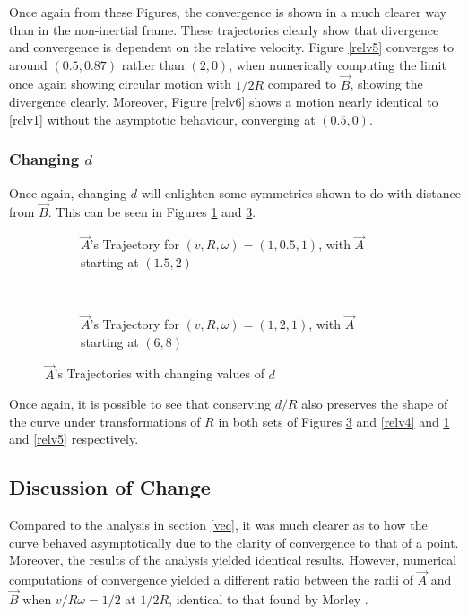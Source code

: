 \documentclass[pstricks, border=12pt]{article}
\begin{document}
Once again from these Figures, the convergence is shown in a much clearer way than in the non-inertial frame. These trajectories clearly show that divergence and convergence is dependent on the relative velocity. Figure \ref{relv5} converges to  around $(0.5, 0.87)$ rather than $(2, 0)$, when numerically computing the limit once again showing circular motion with $1/2R$ compared to $\vec B$, showing the divergence clearly. Moreover, Figure \ref{relv6} shows a motion nearly identical to \ref{relv1} without the asymptotic behaviour, converging at $(0.5, 0)$.

\subsubsection{Changing $d$}

Once again, changing $d$ will enlighten some symmetries shown to do with distance from $\vec B$. This can be seen in Figures \ref{relv8} and \ref{relv7}.
\begin{figure}[tbh]
    \centering
    \begin{subfigure}[t]{0.5\linewidth}
             \centering
             
             \caption{$\vec A$'s Trajectory for $(v, R, \omega) = (1, 0.5, 1)$, with $\vec A$ starting at $(1.5, 2)$}
             \label{relv8}
    \end{subfigure}%
    ~
    \begin{subfigure}[t]{0.5\linewidth}
         \centering
         
         \caption{$\vec A$'s Trajectory for $(v, R, \omega) = (1, 2, 1)$, with $\vec A$ starting at $(6, 8)$}
         \label{relv7}
    \end{subfigure}
    \caption{$\vec A$'s Trajectories with changing values of $d$}
\end{figure}



Once again, it is possible to see that conserving $d/R$ also preserves the shape of the curve under transformations of $R$ in both sets of Figures \ref{relv7} and \ref{relv4} and \ref{relv8} and \ref{relv5} respectively.

\subsection{Discussion of Change}
Compared to the analysis in section \ref{vec}, it was much clearer as to how the curve behaved asymptotically due to the clarity of convergence to that of a point. Moreover, the results of the analysis yielded identical results. However, numerical computations of convergence yielded a different ratio between the radii of $\vec A$ and $\vec B$ when $v/R\omega = 1/2$ at $1/2R$, identical to that found by Morley \cite{ferreol_2017}.
\end{document}
